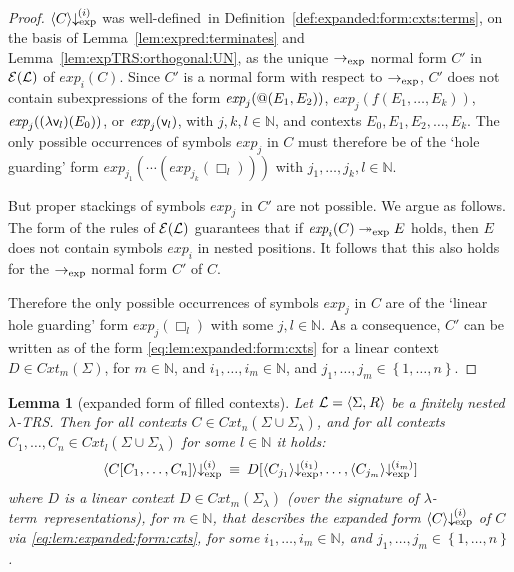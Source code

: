 \documentclass[
submission
]{dmtcs-episciences-tampered}
\makeatletter
\newcommand{\fap}[2]{#1({#2})}
\newcommand{\bfap}[3]{{#1}({#2},\hspace*{0.05pt}{#3})}
\newcommand{\iap}[2]{#1 _{#2}}
\newcommand{\indap}[2]{#1 _{#2}}
\newcommand{\subap}[2]{#1 _{#2}}
\newcommand{\bap}{\subap}
\newcommand{\bpap}[3]{#1 _{#2}^{#3}}
\newcommand{\nb}{\nobreakdash}
\newcommand{\nf}{\normalfont}
\newcommand{\tuple}[1]{\langle #1 \rangle}
\newcommand{\tuplespace}{\hspace*{0.5pt}}
\newcommand{\pair}[2]{\tuple{#1, \tuplespace #2}}
\newcommand{\setexp}[1]{\left\{{#1}\right\}}
\newcommand{\nat}{\mathbb{N}}
\newcommand{\asig}{\Sigma}
\newcommand{\asiglambda}{\indap{\asig}{\lambda}}
\newcommand{\arules}{R}
\newcommand{\alTRS}{{\cal L}}
\newcommand{\TRS}{TRS}
\newcommand{\scontextsover}{\textit{Cxt}}
\newcommand{\scontextsnover}{\bap{\scontextsover}}
\newcommand{\contextsnover}[1]{\fap{\scontextsnover{#1}}}
\newcommand{\sfolapp}{@}
\newcommand{\sfolabs}[1]{(\lambda{#1})}
\newcommand{\folapp}{\bfap{\sfolapp}}
\newcommand{\folabs}[1]{\fap{\sfolabs{#1}}}
\newcommand{\afovar}{\mathsf{v}}
\newcommand{\afovari}[1]{\indap{\afovar}{\hspace*{-0.25pt}#1}}
\newcommand{\afoscopesym}{f}
\newcommand{\afoscope}{\fap{\afoscopesym}}
\newcommand{\cxtap}[2]{{#1}[#2]}
\newcommand{\acxt}{C}
\newcommand{\bcxt}{D}
\newcommand{\ccxt}{E}
\newcommand{\acxtap}{\cxtap{\acxt}}
\newcommand{\bcxtap}{\cxtap{\bcxt}}
\newcommand{\acxti}{\bap{\acxt}}
\newcommand{\ccxti}{\bap{\ccxt}}
\newcommand{\hole}{\Box}
\newcommand{\holei}{\iap{\hole}}
\newcommand{\sexpandTRS}{{\cal E}}
\newcommand{\expandTRSwrt}{\fap{\sexpandTRS}}
\newcommand{\sred}{\to}
\newcommand{\sredi}{\indap{\sred}}
\newcommand{\smred}{\twoheadrightarrow}
\newcommand{\smredi}{\indap{\smred}}
\newcommand{\mredi}[1]{\mathrel{\smredi{#1}}}
\newcommand{\ssyntequal}{{\equiv}}
\newcommand{\syntequal}{\mathrel{\ssyntequal}}
\newcommand{\scriptexp}{\text{\nf exp}}
\newcommand{\sexpand}{\textit{exp}}
\newcommand{\sexpandi}{\indap{\sexpand}}
\newcommand{\expandi}[1]{\fap{\sexpandi{#1}}}
\newcommand{\sexpred}{\sredi{\scriptexp}}
\newcommand{\expmred}{\mredi{\scriptexp}}
\newcommand{\sexprednfi}[1]{{\bpap{\downarrow}{\scriptexp}{\hspace*{-1pt}(#1)}}}
\newcommand{\exprednfi}[2]{{\langle#2\rangle}\sexprednfi{#1}}
\newcommand{\lambdaterm}{$\lambda$\nb-term}
\newcommand{\lTRS}{$\lambda$\hspace*{-0.5pt}\nb-\hspace*{-0.5pt}\TRS}
\newcommand{\welldefined}{well-de\-fined}
\theoremstyle{plain}
\newtheorem{lemma}[theorem]{Lemma}
\theoremstyle{definition}
\makeatother
\begin{document}
\begin{proof}
  $\exprednfi{i}{\acxt}$ was \welldefined\ in Definition~\ref{def:expanded:form:cxts:terms},
    on the basis of Lemma~\ref{lem:expred:terminates} and Lemma~\ref{lem:expTRS:orthogonal:UN},
  as the unique $\sexpred$ normal form $\acxt'$ in $\expandTRSwrt{\alTRS}$ of $\expandi{i}{\acxt}$.
  Since $\acxt'$ is a normal form with respect to $\sexpred$,
  $\acxt'$ does not contain subexpressions of the form 
  $\expandi{j}{\folapp{\ccxti{1}}{\ccxti{2}}}$, 
  $\expandi{j}{\afoscope{\ccxti{1},\ldots,\ccxti{k}}}$,
  $\expandi{j}{\folabs{\afovari{l}}{\ccxti{0}}}$,
  or $\expandi{j}{\afovari{l}}$,
  with $j,k,l\in\nat$, and contexts $\ccxti{0},\ccxti{1},\ccxti{2},\ldots,\ccxti{k}$.
  The only possible occurrences of symbols $\sexpandi{j}$ in $\acxt$ must therefore be of the 
  `hole guarding' form
  $\expandi{j_1}{\cdots(\expandi{j_k}{\holei{l}})}$ with $j_1,\ldots,j_k,l\in\nat$.
  
  But proper stackings of symbols $\sexpandi{j}$ in $\acxt'$ are not possible. We argue as follows. 
  The form of the rules of $\expandTRSwrt{\alTRS}$ guarantees
  that if $\expandi{i}{\acxt} \expmred \ccxt$ holds, then $\ccxt$ does not contain symbols $\sexpandi{i}$ in nested positions.
  It follows that this also holds for the $\sexpred$ normal form $\acxt'$ of $\acxt$.
  
  Therefore the only  possible occurrences of symbols $\sexpandi{j}$ in $\acxt$ are of the 
  `linear hole guarding' form
  $\expandi{j}{\holei{l}}$ with some $j,l\in\nat$.
  As a consequence, $\acxt'$ can be written as of the form \eqref{eq:lem:expanded:form:cxts}
  for a linear context $\bcxt\in\contextsnover{m}{\asig}$, for $m\in\nat$,
  and $i_1,\ldots,i_m\in\nat$, and $j_1,\ldots,j_m\in\setexp{1,\ldots,n}$.
\end{proof}


\begin{lemma}[expanded form of filled contexts]\label{lem:expanded:form:cxtap}
  Let $\alTRS = \pair{\asig}{\arules}$ be a finitely nested \lTRS. 
  Then for all contexts $\acxt\in\contextsnover{n}{\asig\cup\asiglambda}$,
  and for all contexts $\acxti{1},\ldots,\acxti{n}\in\contextsnover{l}{\asig\cup\asiglambda}$ for some $l\in\nat$ it holds:
  \begin{equation}\label{eq:lem:expanded:form:cxtap}
    \exprednfi{i}{ \acxtap{ \acxti{1},\ldots,\acxti{n} } }
      \:\syntequal\:
    \bcxtap{ \exprednfi{i_1}{\acxti{j_1}}, \ldots, \exprednfi{i_m}{\acxti{j_m}} } 
  \end{equation}
  where $\bcxt$ is a linear context $\bcxt\in\contextsnover{m}{\asiglambda}$ (over the signature of \lambdaterm\ representations), for $m\in\nat$,
  that describes the expanded form $\exprednfi{i}{\acxt}$ of $\acxt$ via \eqref{eq:lem:expanded:form:cxts},
  for some $i_1,\ldots,i_m\in\nat$, and $j_1,\ldots,j_m\in\setexp{1,\ldots,n}$.
\end{lemma}
\end{document}
